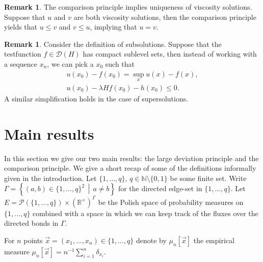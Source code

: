 \documentclass[a4paper]{article}
\newcommand{\cD}{\mathcal{D}}
\newcommand{\cP}{\mathcal{P}}
\newcommand{\bN}{\mathbb{N}}
\newcommand{\bR}{\mathbb{R}}
\numberwithin{equation}{section}
\theoremstyle{definition}
\newtheorem{remark}[theorem]{Remark}
\begin{document}
\begin{remark}
	The comparison principle implies uniqueness of viscosity solutions. Suppose that $u$ and $v$ are both viscosity solutions, then the comparison principle yields that $u \leq v$ and $v \leq u$, implying that $u = v$.
\end{remark}


\begin{remark} \label{remark:existence of optimizers}
	Consider the definition of subsolutions. Suppose that the testfunction $f \in \cD(H)$ has compact sublevel sets, then instead of working with a sequence $x_n$, we can pick a $x_0$ such that
	\begin{gather*}
		u(x_0) - f(x_0)  = \sup_x u(x) - f(x), \\
		u(x_0) - \lambda H f(x_0) - h(x_0) \leq 0.
	\end{gather*}
	A similar simplification holds in the case of supersolutions.
\end{remark}


\section{Main results} \label{section:main_results}


In this section we give our two main results: the large deviation principle and the comparison principle. We give a short recap of some of the definitions informally given in the introduction. Let $\{1,\dots,q\}$, $q \in \bN\setminus\{0,1\}$ be some finite set. Write $\Gamma = \left\{(a,b) \in \{1,\dots,q\}^2 \, \middle| \, a \neq b \right\}$ for the directed edge-set in $\{1,\dots,q\}$. Let $E = \cP(\{1,\dots,q\}) \times (\bR^+)^\Gamma$ be the Polish space of probability measures on $\{1,\dots,q\}$ combined with a space in which we can keep track of the fluxes over the directed bonds in $\Gamma$.

For $n$ points $\vec{x} = (x_1,\dots,x_n) \in \{1,\dots,q\}$ denote by $\mu_n[\vec{x}]$ the empirical measure $\mu_n[\vec{x}] = n^{-1} \sum_{i=1}^n \delta_{x_i}$.

\smallskip
\end{document}
